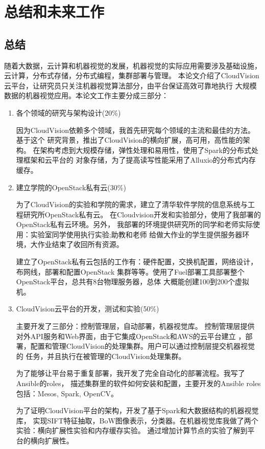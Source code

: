 \chapter{总结和未来工作}

\section{总结}
随着大数据，云计算和机器视觉的发展，机器视觉的实际应用需要涉及基础设施，云计算，分布式存储，分布式编程，集群部署与管理。
本论文介绍了CloudVision云平台，让研究员只关注机器视觉算法部分，由平台保证高效可靠地执行
大规模数据的机器视觉应用。本论文工作主要分成三部分：
\begin{enumerate}
  \item 各个领域的研究与架构设计(20\%)

        因为CloudVision依赖多个领域，我首先研究每个领域的主流和最佳的方法。基于这个
        研究背景，推出了CloudVision的横向扩展，高可用，高性能的架构。
        在架构考虑到大规模存储，弹性处理和易用性，使用了Spark的分布式处理框架和云平台的
        对象存储，为了提高读写性能采用了Alluxio的分布式内存缓存。

  \item 建立学院的OpenStack私有云(30\%)

        为了CloudVision的实验和学院的需求，建立了清华软件学院的信息系统与工程研究所OpenStack私有云。
        在Cloudvision开发和实验部分，使用了我部署的OpenStack私有云环境。另外，
        我部署的环境提供研究所的同学和老师实际使用：实验室同学使用执行实验;助教和老师
        给做大作业的学生提供服务器环境，大作业结束了收回所有资源。
        
        建立了OpenStack私有云包括的工作有：硬件配置，交换机配置，网络设计，布网线，部署和配置OpenStack
        集群等等。使用了Fuel部署工具部署整个OpenStack平台，总共有8台物理服务器，总体
        大概能创建100到200个虚拟机。
  \item CloudVision云平台的开发，测试和实验(50\%)

        主要开发了三部分：控制管理层，自动部署，机器视觉库。
        控制管理层提供对外API服务和Web界面，由于它集成OpenStack和AWS的云平台建立
        ，部署，配置和管理CloudVision的处理集群。用户可以通过控制层提交机器视觉的
        任务，并且执行在被管理的CloudVision处理集群。

        为了能够让平台易于重复部署，我开发了完全自动化的部署流程。我写了Ansible的roles，
        描述集群里的软件如何安装和配置，主要开发的Ansible roles包括：Mesos, Spark, OpenCV。

        为了证明CloudVision平台的架构，开发了基于Spark和大数据结构的机器视觉库，
        实现SIFT特征抽取，BoW图像表示，分类器。在机器视觉库我做了两个实验：横向扩展性实验和内存缓存实验。
        通过增加计算节点的实验了解到平台的横向扩展性。

\end{enumerate}

